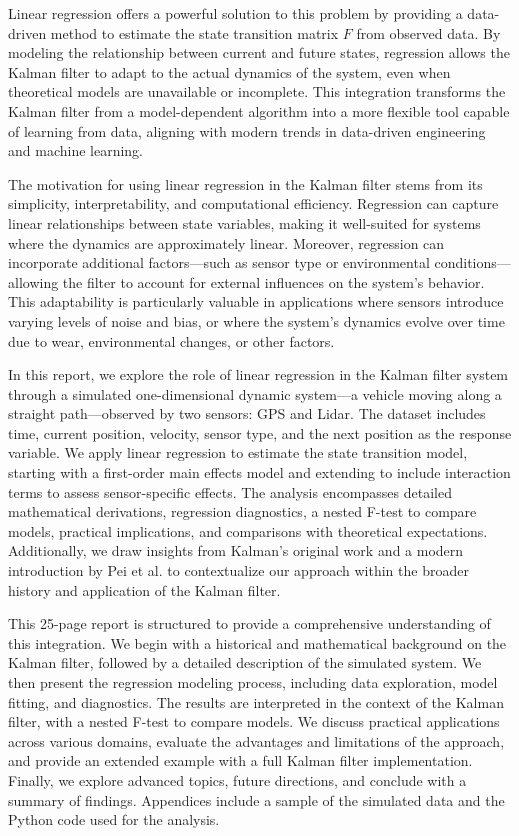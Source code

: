 \documentclass[12pt]{article}
\begin{document}
Linear regression offers a powerful solution to this problem by providing a data-driven method to estimate the state transition matrix \( F \) from observed data. By modeling the relationship between current and future states, regression allows the Kalman filter to adapt to the actual dynamics of the system, even when theoretical models are unavailable or incomplete. This integration transforms the Kalman filter from a model-dependent algorithm into a more flexible tool capable of learning from data, aligning with modern trends in data-driven engineering and machine learning.

The motivation for using linear regression in the Kalman filter stems from its simplicity, interpretability, and computational efficiency. Regression can capture linear relationships between state variables, making it well-suited for systems where the dynamics are approximately linear. Moreover, regression can incorporate additional factors—such as sensor type or environmental conditions—allowing the filter to account for external influences on the system’s behavior. This adaptability is particularly valuable in applications where sensors introduce varying levels of noise and bias, or where the system’s dynamics evolve over time due to wear, environmental changes, or other factors.

In this report, we explore the role of linear regression in the Kalman filter system through a simulated one-dimensional dynamic system—a vehicle moving along a straight path—observed by two sensors: GPS and Lidar. The dataset includes time, current position, velocity, sensor type, and the next position as the response variable. We apply linear regression to estimate the state transition model, starting with a first-order main effects model and extending to include interaction terms to assess sensor-specific effects. The analysis encompasses detailed mathematical derivations, regression diagnostics, a nested F-test to compare models, practical implications, and comparisons with theoretical expectations. Additionally, we draw insights from Kalman’s original work \cite{kalman1960} and a modern introduction by Pei et al. \cite{pei2019} to contextualize our approach within the broader history and application of the Kalman filter.

This 25-page report is structured to provide a comprehensive understanding of this integration. We begin with a historical and mathematical background on the Kalman filter, followed by a detailed description of the simulated system. We then present the regression modeling process, including data exploration, model fitting, and diagnostics. The results are interpreted in the context of the Kalman filter, with a nested F-test to compare models. We discuss practical applications across various domains, evaluate the advantages and limitations of the approach, and provide an extended example with a full Kalman filter implementation. Finally, we explore advanced topics, future directions, and conclude with a summary of findings. Appendices include a sample of the simulated data and the Python code used for the analysis.
\end{document}
